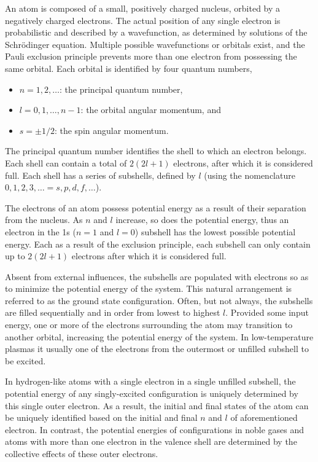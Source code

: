 {An atom is composed of a small, positively charged nucleus, orbited by a
negatively charged electrons. The actual position of any single electron is
probabilistic and described by a wavefunction, as determined by solutions of the
Schr\"{o}dinger equation. Multiple possible wavefunctions or orbitals exist, and
the Pauli exclusion principle prevents more than one electron from possessing
the same orbital. Each orbital is identified by four quantum numbers,
\begin{itemize}
  \item $n=1,2,\ldots$: the principal quantum number,
  \item $l=0,1,\ldots,n-1$: the orbital angular momentum, and
  \item $s=\pm1/2$: the spin angular momentum.
\end{itemize}
The principal quantum number identifies the shell to which an electron belongs.
Each shell can contain a total of $2(2l+1)$ electrons, after which it is
considered full. Each shell has a series of subshells, defined by $l$ (using the
nomenclature $0,1,2,3,\ldots = s,p,d,f,\ldots$). 

The electrons of an atom possess potential energy as a result of their
separation from the nucleus. As $n$ and $l$ increase, so does the potential
energy, thus an electron in the 1s ($n=1$ and $l=0$) subshell has the lowest
possible potential energy. Each as a result of the exclusion principle, each
subshell can only contain up to $2(2l+1)$ electrons after which it is considered
full.

Absent from external influences, the subshells are populated with electrons so
as to minimize the potential energy of the system. This natural arrangement is
referred to as the ground state configuration. Often, but not always, the
subshells are filled sequentially and in order from lowest to highest $l$.
Provided some input energy, one or more of the electrons surrounding the atom
may transition to another orbital, increasing the potential energy of the
system. In low-temperature plasmas it usually one of the electrons from the
outermost or unfilled subshell to be excited.

In hydrogen-like atoms with a single electron in a single unfilled subshell, the
potential energy of any singly-excited configuration is uniquely determined by
this single outer electron. As a result, the initial and final states of the
atom can be uniquely identified based on the initial and final $n$ and $l$ of
aforementioned electron. In contrast, the potential energies of configurations
in noble gases and atoms with more than one electron in the valence shell are
determined by the collective effects of these outer electrons.

}
